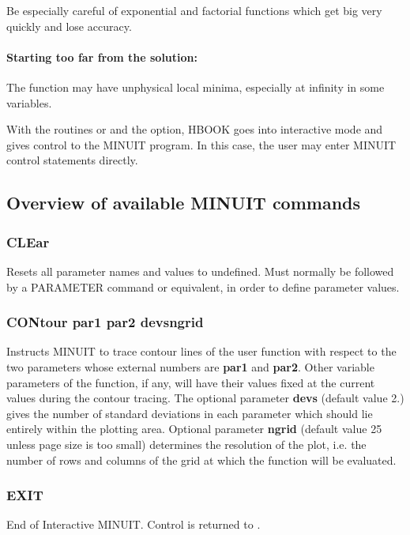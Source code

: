 Be especially careful of exponential and factorial functions
which get big very quickly and lose accuracy.

\paragraph{Starting too far from the solution:}

The function may have unphysical local minima, especially
at infinity in some variables.

\label{H2MWMIN}

With the routines  or  and the
 option, HBOOK goes into interactive mode and gives control to
the MINUIT program.
In this case, the user may enter MINUIT control statements directly.

\subsection*{Overview of available MINUIT commands}

\subsubsection*{CLEar}

Resets all parameter names and values to undefined. Must normally be
followed by a PARAMETER command or equivalent, in order to define
parameter values.
\subsubsection*{CONtour  par1  par2  \lsb devs\rsb   \lsb ngrid\rsb }
\par
Instructs MINUIT to trace contour lines of the user function with
respect to the two parameters whose external numbers are {\bf par1}
and {\bf par2}.
Other variable parameters of the function, if any, will have their
values fixed at the current values during the contour tracing.
The optional parameter {\bf \lsb devs\rsb } (default value 2.)
gives the number of
standard deviations in each parameter which should lie entirely within
the plotting area. Optional parameter {\bf \lsb ngrid\rsb }
(default value 25 unless
page size is too small) determines the resolution of the plot, i.e.
the number of rows and columns of the grid at which the function
will be evaluated.
\subsubsection*{EXIT}
\par
End of Interactive MINUIT. Control is returned to \PAW.
